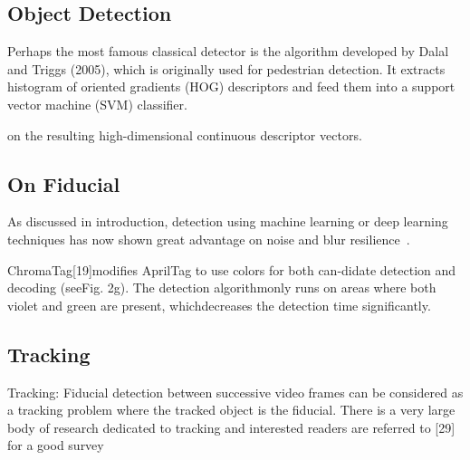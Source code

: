 \documentclass[a4paper]{report}
\begin{document}
\subsection{Object Detection}




Perhaps the most famous classical detector is the algorithm developed by Dalal
and Triggs (2005), which is originally used for pedestrian detection. It extracts histogram of oriented gradients (HOG) descriptors and feed them into a support vector machine (SVM) classifier.


on the resulting high-dimensional continuous descriptor vectors. 

\subsection{On Fiducial}

As discussed in introduction, detection using machine learning or deep learning techniques has now shown great advantage on noise and blur resilience~\cite{prasad2015motion}.


ChromaTag[19]modifies AprilTag to use colors for both can-didate detection and decoding (seeFig. 2g). The detection algorithmonly runs on areas where both violet and green are present, whichdecreases the detection time significantly.


\subsection{Tracking}
Tracking: Fiducial detection between successive video
frames can be considered as a tracking problem where the
tracked object is the fiducial. There is a very large body
of research dedicated to tracking and interested readers are
referred to [29] for a good survey
\end{document}
